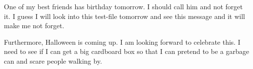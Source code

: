 One of my best friends has birthday tomorrow. I should call him and
not forget it. I guess I will look into this test-file tomorrow and
see this message and it will make me not forget.

Furthermore, Halloween is coming up. I am looking forward to celebrate
this. I need to see if I can get a big cardboard box so that I can
pretend to be a garbage can and scare people walking by.
